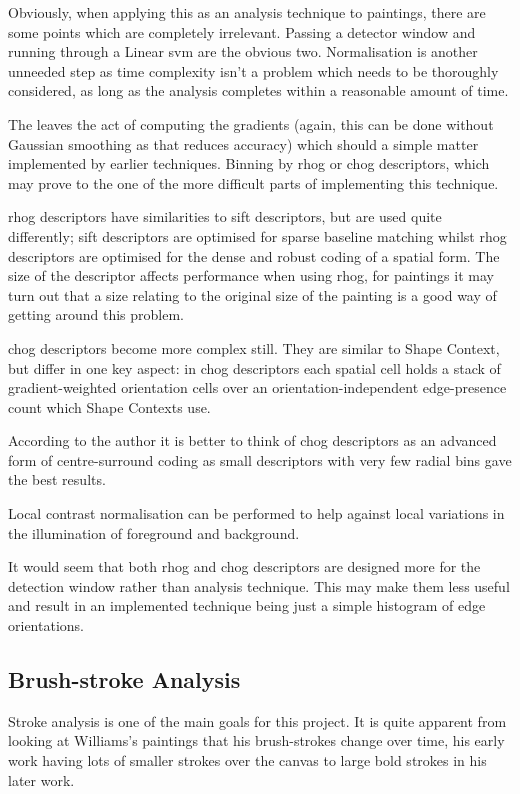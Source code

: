 Obviously, when applying this as an analysis technique to paintings, there are some points which
are completely irrelevant. Passing a detector window and running through a Linear \gls{svm} are
the obvious two. Normalisation is another unneeded step as time complexity isn't a problem which
needs to be thoroughly considered, as long as the analysis completes within a reasonable amount of
time.

The leaves the act of computing the gradients (again, this can be done without Gaussian smoothing
as that reduces accuracy) which should a simple matter implemented by earlier techniques. Binning 
by \gls{rhog} or \gls{chog} descriptors, which may prove to the one of the more difficult parts of
implementing this technique.

\Gls{rhog} descriptors have similarities to \gls{sift} descriptors, but are used quite 
differently; \gls{sift} descriptors are optimised for sparse baseline matching whilst \gls{rhog}
descriptors are optimised for the dense and robust coding of a spatial form. The size of the
descriptor affects performance when using \gls{rhog}, for paintings it may turn out that a size
relating to the original size of the painting is a good way of getting around this problem.

\Gls{chog} descriptors become more complex still. They are similar to Shape 
Context\cite{ Belongie2001Matching}, but differ in one key aspect: in \gls{chog} descriptors each
spatial cell holds a stack of gradient-weighted orientation cells over an orientation-independent
edge-presence count which Shape Contexts use.

According to the author it is better to think of \gls{chog} descriptors as an advanced form of 
centre-surround coding as small descriptors with very few radial bins gave the best results.

Local contrast normalisation can be performed to help against local variations in the illumination
of foreground and background.

It would seem that both \gls{rhog} and \gls{chog} descriptors are designed more for the detection
window rather than analysis technique. This may make them less useful and result in an implemented
technique being just a simple histogram of edge orientations.

\subsection{Brush-stroke Analysis}\label{sec:existing-brush-stroke}
Stroke analysis is one of the main goals for this project. It is quite apparent from looking at 
Williams's paintings that his brush-strokes change over time, his early work having lots of
smaller strokes over the canvas to large bold strokes in his later work.

